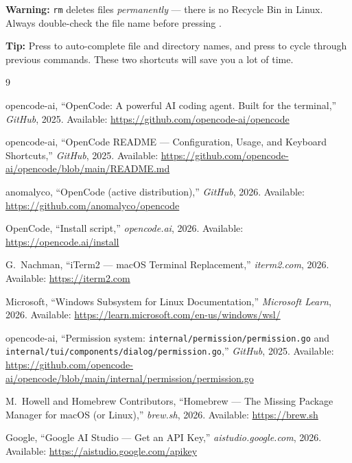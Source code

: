 \documentclass[11pt]{article}
\newcommand{\key}[1]{\keystroke{#1}}
\newcommand{\keystroke}[1]{%
  \tikz[baseline=(key.base)]{%
    \node[draw, rounded corners=2pt, inner sep=2pt, fill=gray!10,
          font=\ttfamily\small] (key) {#1};%
  }%
}
\begin{document}
\begin{alert-box}
\textbf{Warning:} \texttt{rm} deletes files \emph{permanently} --- there is no Recycle Bin in Linux.  Always double-check the file name before pressing \key{Enter}.
\end{alert-box}

\begin{alert-box}
\textbf{Tip:} Press \key{Tab} to auto-complete file and directory names, and press \key{Up} to cycle through previous commands.  These two shortcuts will save you a lot of time.
\end{alert-box}


\begin{thebibliography}{9}

opencode-ai, ``OpenCode: A powerful AI coding agent. Built for the terminal,'' \emph{GitHub}, 2025. Available: \url{https://github.com/opencode-ai/opencode}

opencode-ai, ``OpenCode README --- Configuration, Usage, and Keyboard Shortcuts,'' \emph{GitHub}, 2025. Available: \url{https://github.com/opencode-ai/opencode/blob/main/README.md}

anomalyco, ``OpenCode (active distribution),'' \emph{GitHub}, 2026. Available: \url{https://github.com/anomalyco/opencode}

OpenCode, ``Install script,'' \emph{opencode.ai}, 2026. Available: \url{https://opencode.ai/install}

G.~Nachman, ``iTerm2 --- macOS Terminal Replacement,'' \emph{iterm2.com}, 2026. Available: \url{https://iterm2.com}

Microsoft, ``Windows Subsystem for Linux Documentation,'' \emph{Microsoft Learn}, 2026. Available: \url{https://learn.microsoft.com/en-us/windows/wsl/}

opencode-ai, ``Permission system: \texttt{internal/permission/permission.go} and \texttt{internal/tui/components/dialog/permission.go},'' \emph{GitHub}, 2025. Available: \url{https://github.com/opencode-ai/opencode/blob/main/internal/permission/permission.go}

M.~Howell and Homebrew Contributors, ``Homebrew --- The Missing Package Manager for macOS (or Linux),'' \emph{brew.sh}, 2026. Available: \url{https://brew.sh}

Google, ``Google AI Studio --- Get an API Key,'' \emph{aistudio.google.com}, 2026. Available: \url{https://aistudio.google.com/apikey}

\end{thebibliography}
\end{document}
